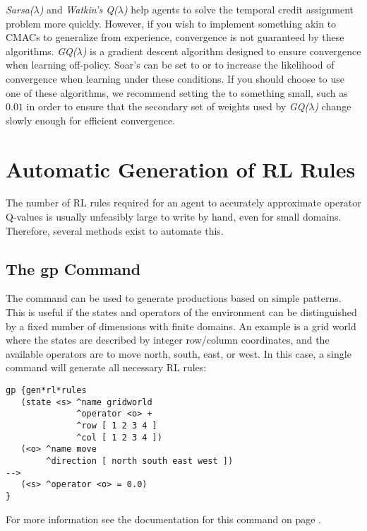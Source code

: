 \emph{Sarsa($\lambda$)} and \emph{Watkin's Q($\lambda$)} help agents to solve the temporal credit assignment problem more quickly.
However, if you wish to implement something akin to CMACs to generalize from experience, convergence is not guaranteed by these algorithms.
\emph{GQ($\lambda$)} is a gradient descent algorithm designed to ensure convergence when learning off-policy.
Soar's  can be set to  or  to increase the likelihood of convergence when learning under these conditions.
If you should choose to use one of these algorithms, we recommend setting the   to something small, such as $0.01$ in order to ensure that the secondary set of weights used by \emph{GQ($\lambda$)} change slowly enough for efficient convergence.

\section{Automatic Generation of RL Rules}

The number of RL rules required for an agent to accurately approximate operator Q-values is usually unfeasibly large to write by hand, even for small domains.
Therefore, several methods exist to automate this.

\subsection{The gp Command}
The  command can be used to generate productions based on simple patterns.
This is useful if the states and operators of the environment can be distinguished by a fixed number of dimensions with finite domains.
An example is a grid world where the states are described by integer row/column coordinates, and the available operators are to move north, south, east, or west.
In this case, a single  command will generate all necessary RL rules:
	
\begin{verbatim}
gp {gen*rl*rules
   (state <s> ^name gridworld
              ^operator <o> +
              ^row [ 1 2 3 4 ]
              ^col [ 1 2 3 4 ])
   (<o> ^name move
        ^direction [ north south east west ])
-->
   (<s> ^operator <o> = 0.0)
}
\end{verbatim}
	
For more information see the documentation for this command on page \pageref{gp}.

